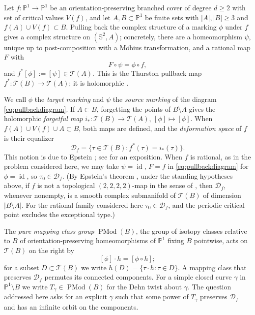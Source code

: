 \documentclass[11pt]{article}
\newcommand{\Pone}{\mathbb P^1}
\newcommand{\Sph}{\mathbb S^2}
\newcommand{\Teich}{\mathcal T}
\newcommand{\D}{\mathcal D}
\newcommand{\id}{\operatorname{id}}
\newcommand{\PMod}{\operatorname{PMod}}
\theoremstyle{remark}
\numberwithin{equation}{section}
\begin{document}
Let $f\colon\Pone\to\Pone$ be an orientation-preserving branched cover of
degree $d\ge2$ with set of critical values $V(f)$, and let $A,B\subset\Pone$
be finite sets with $|A|,|B|\ge3$ and $f(A)\cup V(f)\subset B$.
Pulling back the complex structure of a marking $\phi$ under $f$ gives a
complex structure on $(\Sph,A)$; concretely, there are a homeomorphism
$\psi$, unique up to post-composition with a M\"obius transformation, and a
rational map $F$ with
\begin{equation}\label{eq:pullbackdiagram}
 F\circ\psi=\phi\circ f ,
\end{equation}
and $f^*[\phi]:=[\psi]\in\Teich(A)$. This is the Thurston pullback map
$f^*\colon\Teich(B)\to\Teich(A)$; it is holomorphic
\cite[\S1.3, Prop.\ 1.4]{BCT}.

We call $\phi$ the \emph{target marking} and
$\psi$ the \emph{source marking} of the diagram
\eqref{eq:pullbackdiagram}. If $A\subset B$, forgetting the points of
$B\setminus A$ gives the holomorphic \emph{forgetful map}
$i_*\colon\Teich(B)\to\Teich(A)$, $[\phi]\mapsto[\phi]$. When
$f(A)\cup V(f)\cup A\subset B$, both maps are defined, and the
\emph{deformation space} of $f$ is their equalizer
\[
 \D_f=\{\tau\in\Teich(B):f^*(\tau)=i_*(\tau)\}.
\]
This notion is due to Epstein \cite{Ep}; see \cite[\S1.4]{BCT} for an
exposition. When $f$ is rational, as in the problem considered here, we
may take $\psi=\id$, $F=f$ in \eqref{eq:pullbackdiagram} for $\phi=\id$,
so $\tau_0\in\D_f$. (By Epstein's theorem \cite[Thm.\ 1.5]{BCT}, under the
standing hypotheses above, if $f$ is not a topological $(2,2,2,2)$-map in
the sense of \cite[\S1.4]{BCT}, then $\D_f$, whenever nonempty, is a smooth
complex submanifold of $\Teich(B)$ of dimension $|B\setminus A|$. For the
rational family considered here $\tau_0\in\D_f$, and the periodic critical
point excludes the exceptional type.)

The \emph{pure mapping class group} $\PMod(B)$, the group of isotopy classes
relative to $B$ of orientation-preserving homeomorphisms of $\Pone$ fixing
$B$ pointwise, acts on $\Teich(B)$ on the right by
\begin{equation}\label{eq:rightaction}
 [\phi]\cdot h=[\phi\circ h];
\end{equation}
for a subset $D\subset\Teich(B)$ we write $h(D)=\{\tau\cdot h:\tau\in D\}$.
A mapping class that preserves $\D_f$ permutes its connected components.
For a simple closed curve $\gamma$ in $\Pone\setminus B$ we write
$T_\gamma\in\PMod(B)$ for the Dehn twist about $\gamma$. The question
addressed here asks for an explicit $\gamma$ such that some power of
$T_\gamma$ preserves $\D_f$ and has an infinite orbit on the components.
\end{document}
